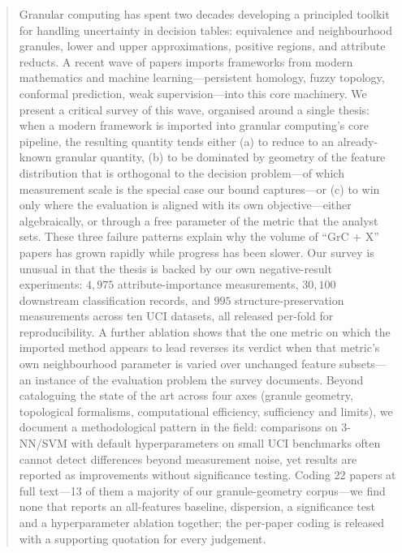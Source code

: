 \documentclass[a4paper,fleqn]{cas-sc}
\begin{document}
\begin{abstract}
Granular computing has spent two decades developing a principled toolkit
for handling uncertainty in decision tables: equivalence and neighbourhood
granules, lower and upper approximations, positive regions, and attribute
reducts.  A recent wave of papers imports frameworks from modern mathematics
and machine learning---persistent homology, fuzzy topology, conformal
prediction, weak supervision---into this core machinery.  We present a
critical survey of this wave, organised around a single thesis: when a
modern framework is imported into granular computing's core pipeline, the
resulting quantity tends either (a) to reduce to an already-known granular
quantity, (b) to be dominated by geometry of the feature distribution that is
orthogonal to the decision problem---of which measurement scale is the
special case our bound captures---or (c) to win only where the evaluation
is aligned with its own objective---either algebraically, or through a free
parameter of the metric that the analyst sets.  These three failure patterns explain why the volume of
``GrC + X'' papers has grown rapidly while progress has been slower.
Our survey is unusual in that the thesis is backed by our own negative-result
experiments: $4{,}975$ attribute-importance measurements, $30{,}100$
downstream classification records, and $995$ structure-preservation
measurements across ten UCI datasets, all released per-fold for
reproducibility.  A further ablation shows that the one metric on which the
imported method appears to lead reverses its verdict when that metric's own
neighbourhood parameter is varied over unchanged feature subsets---an
instance of the evaluation problem the survey documents.  Beyond cataloguing the state of the art across four axes
(granule geometry, topological formalisms, computational efficiency,
sufficiency and limits), we document a methodological pattern in the field:
comparisons on 3-NN/SVM with default hyperparameters on small UCI benchmarks
often cannot detect differences beyond measurement noise, yet results are
reported as improvements without significance testing.  Coding 22 papers at
full text---13 of them a majority of our granule-geometry corpus---we find
none that reports an all-features baseline, dispersion, a significance test
and a hyperparameter ablation together; the per-paper coding is released with
a supporting quotation for every judgement.
\end{abstract}
\end{document}
